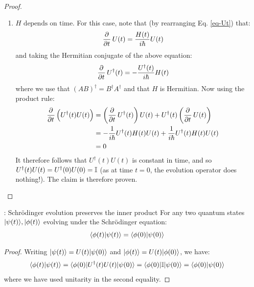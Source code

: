 \begin{proof}
\begin{enumerate}
        \item $\boxed{H \text{ depends on time}}$. For this case, note that (by rearranging Eq. \eqref{eq-Ut}) that:
        \begin{equation}\label{eq-dpdUt}
            \dpd{}{t}U(t) = \frac{H(t)}{i\hbar}U(t)
        \end{equation}
        and taking the Hermitian conjugate of the above equation:
        \begin{equation}\label{eq-dpdUdagt}
            \dpd{}{t}U^\dag(t) = -\frac{U^\dag(t)}{i\hbar}H(t)
        \end{equation}
        where we use that $(AB)^\dag = B^\dag A^\dag$ and that $H$ is Hermitian. Now using the product rule:
        \begin{equation}
            \begin{split}
                \dpd{}{t}\left(U^\dag(t) U(t)\right) &= \left(\dpd{}{t}U^\dag(t)\right)U(t) + U^\dag(t)\left(\dpd{}{t}U(t)\right) 
                \\ &= -\frac{1}{i\hbar}U^\dag(t)H(t)U(t) + \frac{1}{i\hbar}U^\dag(t)H(t)U(t)
                \\ &= 0
            \end{split}
        \end{equation}
        It therefore follows that $U^\dag(t)U(t)$ is constant in time, and so $U^\dag(t)U(t) = U^\dag(0)U(0) = \mathbb{I}$ (as at time $t = 0$, the evolution operator does nothing!). The claim is therefore proven. 
    \end{enumerate}
\end{proof}

\begin{corbox}{: Schr\"{o}dinger evolution preserves the inner product}
    For any two quantum states $\ket{\psi(t)}, \ket{\phi(t)}$ evolving under the Schr\"{o}dinger equation:
    \begin{equation}
        \braket{\phi(t)}{\psi(t)} = \braket{\phi(0)}{\psi(0)}
    \end{equation}
\end{corbox}

\begin{proof}
    Writing $\lvert \psi(t) \rangle = U(t)\lvert \psi(0) \rangle$ and $\ket{\phi(t)} = U(t)\ket{\phi(0)}$, we have:
    \begin{equation}
        \braket{\phi(t)}{\psi(t)} = \bra{\phi(0)}U^\dag(t) U(t)\ket{\psi(0)} = \bra{\phi(0)}\II\ket{\psi(0)} = \braket{\phi(0)}{\psi(0)}
    \end{equation}
    where we have used unitarity in the second equality. 
\end{proof}

